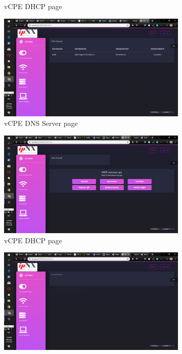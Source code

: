 \begin{figure}[h!]
\begin{subfigure}[b]{0.45\textwidth}
	\caption{\ac{vCPE} DHCP page}
\end{subfigure}
\hfill
\begin{subfigure}[b]{0.45\textwidth}
	\centering
	\includegraphics[width=\textwidth]{./vcpednsserver}
	\caption{\ac{vCPE}  DNS Server page}
\end{subfigure}
\hfill
\begin{subfigure}[b]{0.45\textwidth}
	\centering
	\includegraphics[width=\textwidth]{./vcpedhcp}
	\caption{\ac{vCPE} DHCP page}
\end{subfigure}
\hfill
\begin{subfigure}[b]{0.45\textwidth}
	\centering
	\includegraphics[width=\textwidth]{./vcpedevice}

\end{subfigure}
\end{figure}
